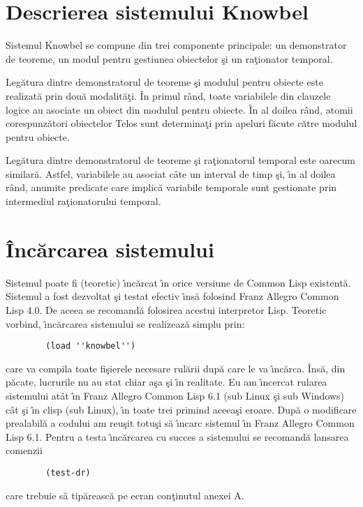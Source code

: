 \documentclass{article}
\begin{document}
\section{Descrierea sistemului Knowbel}
Sistemul Knowbel se compune din trei componente principale: un demonstrator de
teoreme, un modul pentru gestiunea obiectelor \c{s}i un ra\c{t}ionator temporal.

Leg\u{a}tura dintre demonstratorul de teoreme \c{s}i modulul pentru obiecte este
realizat\u{a} prin dou\u{a} modalit\u{a}\c{t}i. \^{I}n primul r\^{a}nd, toate
variabilele din clauzele logice au asociate un obiect din modulul pentru obiecte.
\^{I}n al doilea r\^{a}nd, atomii corespunz\u{a}tori obiectelor Telos sunt
determina\c{t}i prin apeluri f\u{a}cute c\u{a}tre modulul pentru obiecte.

Leg\u{a}tura dintre demonstratorul de teoreme \c{s}i ra\c{t}ionatorul temporal
este oarecum similar\u{a}. Astfel, variabilele au asociat c\^{a}te un interval
de timp \c{s}i, \^{\i}n al doilea r\^{a}nd, anumite predicate care implic\u{a}
variabile temporale sunt gestionate prin intermediul ra\c{t}ionatorului temporal.

\section{\^{I}nc\u{a}rcarea sistemului}
Sistemul poate fi (teoretic) \^{\i}nc\u{a}rcat \^{\i}n orice versiune de Common
Lisp existent\u{a}. Sistemul a fost dezvoltat \c{s}i testat efectiv \^{\i}ns\u{a}
folosind Franz Allegro Common Lisp 4.0. De aceea se recomand\u{a} folosirea
acestui interpretor Lisp. Teoretic vorbind, \^{\i}nc\u{a}rcarea sistemului
se realizeaz\u{a} simplu prin:
\begin{verbatim}
        (load ''knowbel'')
\end{verbatim}
care va compila toate fi\c{s}ierele necesare rul\u{a}rii dup\u{a} care le va
\^{\i}nc\u{a}rca. \^{I}ns\u{a}, din p\u{a}cate, lucrurile nu au stat chiar
a\c{s}a \c{s}i \^{\i}n realitate. Eu am \^{\i}ncercat rularea sistemului
at\^{a}t \^{\i}n Franz Allegro Common Lisp 6.1 (sub Linux \c{s}i sub Windows)
c\^{a}t \c{s}i \^{\i}n clisp (sub Linux), \^{\i}n toate trei primind aceea\c{s}i
eroare. Dup\u{a} o modificare prealabil\u{a} a codului am reu\c{s}it totu\c{s}i
s\u{a} \^{\i}ncarc sistemul \^{\i}n Franz Allegro Common Lisp 6.1. Pentru a
testa \^{\i}nc\u{a}rcarea cu succes a sistemului se recomand\u{a} lansarea
comenzii
\begin{verbatim}
        (test-dr)
\end{verbatim}
care trebuie s\u{a} tip\u{a}reasc\u{a} pe ecran con\c{t}inutul anexei A.
\end{document}
